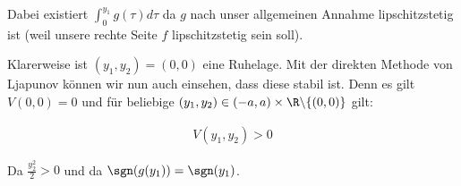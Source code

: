 \begin{solution}
Dabei existiert $\int_0^{y_1} g(\tau)d\tau$ da $g$ nach unser allgemeinen Annahme
lipschitzstetig ist (weil unsere rechte Seite $f$ lipschitzstetig sein soll).

Klarerweise ist $(y_1,y_2) = (0,0)$ eine Ruhelage. Mit der direkten Methode von Ljapunov
können wir nun auch einsehen, dass diese stabil ist. Denn es gilt $V(0,0) = 0$ und für
beliebige $(y_1,y_2) \in (-a,a) \times \R \backslash \{(0,0)\}$ gilt:

\begin{align*}
  V(y_1,y_2) > 0
\end{align*}

Da $\frac{y_2^2}{2} > 0$ und da $\sgn(g(y_1))=\sgn(y_1)$.
\end{solution}
